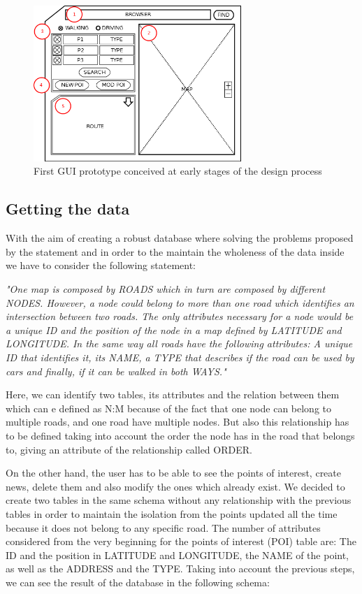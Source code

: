 \documentclass{article}
\begin{document}
\begin{figure}[h]
\centering
\includegraphics[width=0.7\textwidth]{Prototype.png}
\caption{First GUI prototype conceived at early stages of the design process}
\label{fig:GUIprototype}
\end{figure}

\subsection{Getting the data}
With the aim of creating a robust database where solving the problems proposed by the statement and in order to the maintain the wholeness of the data inside we have to consider the following statement:

\textit{"One map is composed by ROADS which in turn are composed by different NODES. However, a node could belong to more than one road which identifies an intersection between two roads. The only attributes necessary for a node would be a unique ID and the position of the node in a map defined by LATITUDE and LONGITUDE. In the same way all roads have the following attributes: A unique ID that identifies it, its NAME, a TYPE that describes if the road can be used by cars and finally, if it can be walked in both WAYS."}

Here, we can identify two tables, its attributes and the relation between them which can e defined as N:M because of the fact that one node can belong to multiple roads, and one road have multiple nodes. But also this relationship has to be defined taking into account the order the node has in the road that belongs to, giving an attribute of the relationship called ORDER.

On the other hand, the user has to be able to see the points of interest, create news, delete them and also modify the ones which already exist. We decided to create two tables in the same schema without any relationship with the previous tables in order to maintain the isolation from the points updated all the time because it does not belong to any specific road.
The number of attributes considered from the very beginning for the points of interest (POI) table are: The ID and the position in LATITUDE and LONGITUDE, the NAME of the point, as well as the ADDRESS and the TYPE. Taking into account the previous steps, we can see the result of the database in the following schema:
\end{document}
